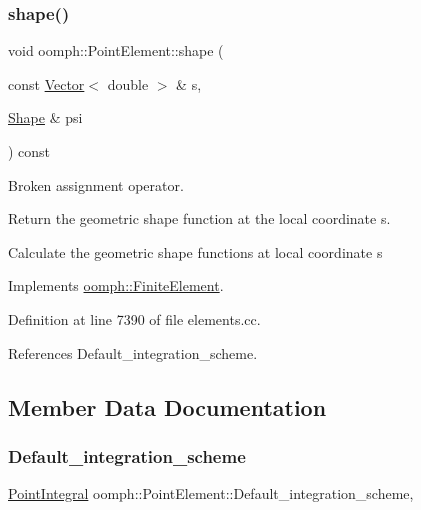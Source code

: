 \subsubsection{\texorpdfstring{shape()}{shape()}}
{\footnotesize\ttfamily void oomph\+::\+Point\+Element\+::shape (\begin{DoxyParamCaption}\item[{const \hyperlink{classoomph_1_1Vector}{Vector}$<$ double $>$ \&}]{s,  }\item[{\hyperlink{classoomph_1_1Shape}{Shape} \&}]{psi }\end{DoxyParamCaption}) const\hspace{0.3cm}{\ttfamily [virtual]}}



Broken assignment operator. 

Return the geometric shape function at the local coordinate s.

Calculate the geometric shape functions at local coordinate s 

Implements \hyperlink{classoomph_1_1FiniteElement_a58a25b6859ddd43b7bfe64a19fee5023}{oomph\+::\+Finite\+Element}.



Definition at line 7390 of file elements.\+cc.



References Default\+\_\+integration\+\_\+scheme.



\subsection{Member Data Documentation}
\mbox{\label{classoomph_1_1PointElement_a812180fd4abef76f519f07fa5ca01401}} 
\subsubsection{\texorpdfstring{Default\+\_\+integration\+\_\+scheme}{Default\_integration\_scheme}}
{\footnotesize\ttfamily \hyperlink{classoomph_1_1PointIntegral}{Point\+Integral} oomph\+::\+Point\+Element\+::\+Default\+\_\+integration\+\_\+scheme\hspace{0.3cm}{\ttfamily [static]}, {\ttfamily [private]}}




